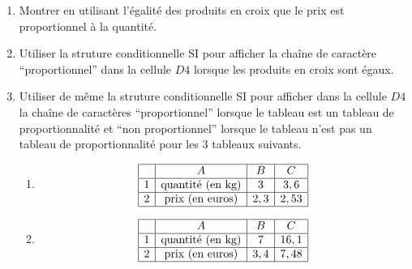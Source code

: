 \documentclass{article}
\begin{document}
\begin{enumerate}[leftmargin=0cm,itemindent=.5cm,labelwidth=\itemindent,labelsep=0cm,align=left,label=\arabic*)]

\item Montrer en utilisant l'égalité des produits en croix que le prix est proportionnel à la quantité.
  
\item Utiliser la struture conditionnelle SI pour afficher la chaîne de caractère ``proportionnel'' dans la cellule $D4$ lorsque les produits en croix sont égaux.


\item Utiliser de même la struture conditionnelle SI pour afficher dans la cellule $D4$
  la chaîne de caractères ``proportionnel''  lorsque le tableau est un tableau de proportionnalité
  et ``non proportionnel'' lorsque le tableau n'est pas un tableau de proportionnalité pour les $3$ tableaux suivants.


  \begin{enumerate}[leftmargin=0cm,itemindent=.5cm,labelwidth=\itemindent,labelsep=0cm,align=left,label=\alph*)]
    
  \item 
    \begin{equation*}
      \begin{array}{|c|c|c|c|}
        \hline
        & A & B & C \\
        \hline
        1 & \textrm{quantité (en kg)} & 3 & 3,6 \\
        \hline
        2 & \textrm{prix (en euros)} & 2,3 & 2,53 \\
        \hline
      \end{array}
    \end{equation*}
    
  \item 
    \begin{equation*}
      \begin{array}{|c|c|c|c|}
        \hline
        & A & B & C \\
        \hline
        1 & \textrm{quantité (en kg)} & 7 & 16,1 \\
        \hline
        2 & \textrm{prix (en euros)} & 3,4 & 7,48 \\
        \hline
      \end{array}
    \end{equation*}
    

\end{enumerate}
\end{enumerate}
\end{document}
